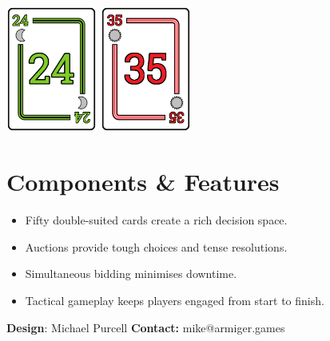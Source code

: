 \documentclass[a5paper, DIV=18, 12pt]{scrartcl}
\begin{document}
\begin{multicols}{2}
\begin{center}
\vspace{1.0ex}

\includegraphics[width=0.225\textwidth]{Images/single_display_card_24.pdf} \hfill \includegraphics[width=0.225\textwidth]{Images/single_display_card_35.pdf} 
\end{center}

\vfill\null
\end{multicols}

\vspace{-7ex}

\section*{\phantom{a}\hfill Components \& Features\hfill \phantom{a}}
\begin{itemize}[leftmargin=*, nosep]
\item \hspace{0.05pt}Fifty double-suited cards create a rich decision space.  
\vspace{0.4ex}
\item Auctions provide tough choices and tense resolutions.
\vspace{0.4ex}
\item Simultaneous bidding minimises downtime.
\vspace{0.4ex}
\item Tactical gameplay keeps players engaged from start to finish.
\end{itemize}
\vfill


\begin{center}
\textbf{Design}: Michael Purcell \hfill \textbf{Contact:} mike@armiger.games
\end{center}
\end{document}
